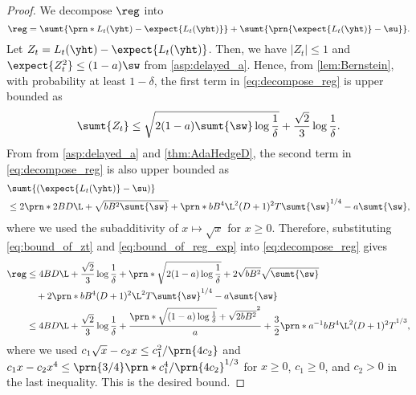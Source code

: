 \begin{proof}
    We decompose $\reg$ into     
    \begin{equation}\label{eq:decompose_reg}
    \reg
    =\sumt{\prn*{L_t(\yht)-\expect{L_t(\yht)}}}+\sumt{\prn{\expect{L_t(\yht)}-\su}}.
    \end{equation}
    Let $Z_t=L_t(\yht)-\expect{L_t(\yht)}$. 
    Then, we have $|Z_t|\leq 1$ and $\expect{Z_t^2}\leq (1-a)\sw$ from \cref{asp:delayed_a}.
    Hence, from \cref{lem:Bernstein}, with probability at least $1 - \delta$, the first term in \eqref{eq:decompose_reg} is upper bounded as 
    \begin{equation}\label{eq:bound_of_zt}
        \sumt{Z_t}\leq\sqrt{2(1-a)\sumt{\sw}\log\frac{1}{\delta}}+\frac{\sqrt{2}}{3}\log\frac{1}{\delta}.
    \end{equation}
    From from \cref{asp:delayed_a} and \cref{thm:AdaHedgeD},
    the second term in \eqref{eq:decompose_reg} is also upper bounded as 
    \begin{align}
        &
        \sumt{(\expect{L_t(\yht)}-\su)}
        \nonumber \\
        &\leq
        2\prn*{2BD\L+\sqrt{bB^2\sumt{\sw}}+  \prn*{b B^4 \L^2 (D+1)^2T\sumt{\sw}}^{1/4}} - a\sumt{\sw},
        \label{eq:bound_of_reg_exp}
    \end{align}
    where we used the subadditivity of $x \mapsto \sqrt{x}$ for $x \geq 0$.
    Therefore, substituting \eqref{eq:bound_of_zt} and \eqref{eq:bound_of_reg_exp} into \eqref{eq:decompose_reg} gives 
    \begin{align*}
        \reg&\leq 4BD\L+\frac{\sqrt{2}}{3}\log\frac{1}{\delta}
        +\prn*{\sqrt{ 2 (1-a) \log \frac{1}{\delta} } + 2\sqrt{bB^2}}\sqrt{\sumt{\sw}}\\
        &\quad+2\prn*{b B^4 (D+1)^2 \L ^2T\sumt{\sw}}^{1/4} - a\sumt{\sw}\\
        &\leq 4BD\L+\frac{\sqrt{2}}{3}\log\frac{1}{\delta}
        +\frac{\prn*{\sqrt{(1-a)\log\frac{1}{\delta}}+\sqrt{2bB^2}}^2}{a}
        +\frac{3}{2}\prn*{a^{-1}bB^4\L^2(D+1)^2T}^{1/3},
    \end{align*}
    where we used $c_1\sqrt{x}-c_2x\leq{c_1^2}/\prn{4c_2}$ and $c_1x-c_2x^4\leq\prn{{3}/{4}}\prn*{{c_1^4}/\prn{4c_2}}^{1/3}$ for $x\geq0$, $c_1\geq 0$, and $c_2>0$ in the last inequality.
    This is the desired bound.
\end{proof}